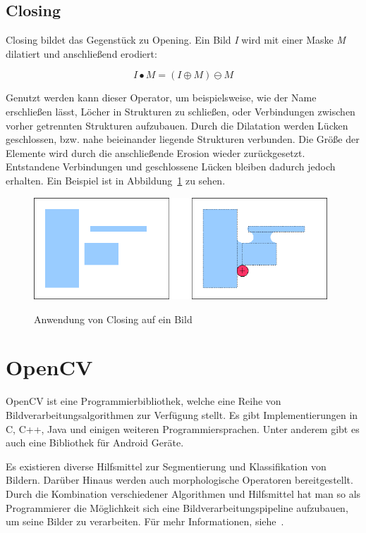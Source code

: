 \subsection{Closing}
Closing bildet das Gegenstück zu Opening.
Ein Bild {\em I} wird mit einer Maske {\em M} dilatiert und anschließend erodiert:

$$ I \bullet M = ( I \oplus M ) \ominus M $$

Genutzt werden kann dieser Operator, um beispielsweise, wie der Name erschließen lässt, Löcher in Strukturen zu schließen, oder Verbindungen zwischen vorher getrennten Strukturen aufzubauen.
Durch die Dilatation werden Lücken geschlossen, bzw. nahe beieinander liegende Strukturen verbunden. Die Größe der Elemente wird durch die anschließende Erosion wieder zurückgesetzt. Entstandene Verbindungen und geschlossene Lücken bleiben dadurch jedoch erhalten.
Ein Beispiel ist in Abbildung~\ref{fig:Closing} zu sehen.

\begin{figure}[ht]
   \centering
     \includegraphics[width=11cm]{Bilder/MorphologicalClosing} \\
 \caption{Anwendung von Closing auf ein Bild}
 \label{fig:Closing}
\end{figure}

\section{OpenCV} %
\label{sec:OpenCV}
OpenCV ist eine Programmierbibliothek, welche eine Reihe von Bildverarbeitungsalgorithmen zur Verfügung stellt.
Es gibt Implementierungen in C, C++, Java und einigen weiteren Programmiersprachen. Unter anderem gibt es auch eine Bibliothek für Android Geräte.

Es existieren diverse Hilfsmittel zur Segmentierung und Klassifikation von Bildern. Darüber Hinaus werden auch morphologische Operatoren bereitgestellt. Durch die Kombination verschiedener Algorithmen und Hilfsmittel hat man so als Programmierer die Möglichkeit sich eine Bildverarbeitungspipeline aufzubauen, um seine Bilder zu verarbeiten. Für mehr Informationen, siehe~\cite{opencv}.
